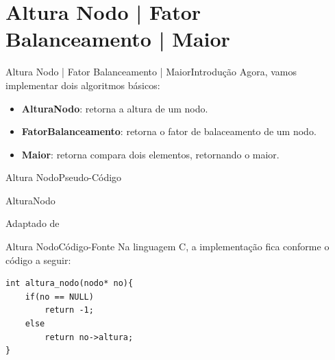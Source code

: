 \documentclass[aspectratio=169]{beamer}
\begin{document}
\section{Altura Nodo | Fator Balanceamento | Maior}

\begin{frame}{Altura Nodo | Fator Balanceamento | Maior}{Introdução}
Agora, vamos implementar dois algoritmos básicos:
\begin{itemize}
 \item {\bf AlturaNodo}: retorna a altura de um nodo.
 \item {\bf FatorBalanceamento}: retorna o fator de balaceamento de um nodo.
 \item {\bf Maior}: retorna compara dois elementos, retornando o maior.
\end{itemize}
\end{frame}


\begin{frame}{Altura Nodo}{Pseudo-Código}
\begin{algorithm}[H]
\caption{AlturaNodo} 
\label{AlturaNodo}
\end{algorithm}
\tiny{Adaptado de \cite{Backes2016}}  
\end{frame}


\begin{frame}[fragile]{Altura Nodo}{Código-Fonte}
Na linguagem C, a implementação fica conforme o código a seguir:
\begin{lstlisting}[style=CStyle]
int altura_nodo(nodo* no){
    if(no == NULL)
        return -1;
    else
		return no->altura;
}
\end{lstlisting}  
\end{frame}

\end{document}
